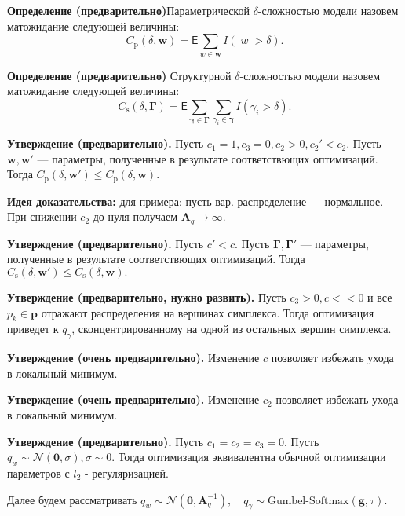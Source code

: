 \documentclass[12pt]{article}
\begin{document}
\textbf{Определение (предварительно)}Параметрической $\delta$-сложностью модели назовем матожидание следующей величины:
\[
    C_\text{p}(\delta, \mathbf{w}) = \mathsf{E}\sum_{w \in \mathbf{w}} I(|w| > \delta).
\] 

\textbf{Определение (предварительно)} Структурной $\delta$-сложностью модели назовем матожидание следующей величины:
\[
     C_\text{s}(\delta, \boldsymbol{\Gamma}) = \mathsf{E}\sum_{\boldsymbol{\gamma} \in \boldsymbol{\Gamma}}\sum_{\gamma_i \in \boldsymbol{\gamma}} I(\gamma_i > \delta). 
\]


\textbf{Утверждение (предварительно).} Пусть $c_1 = 1, c_3 = 0, c_2 > 0, c_2' < c_2$. Пусть $\mathbf{w}, \mathbf{w}'$ --- параметры, полученные в результате соответствющих оптимизаций. Тогда  $C_\text{p}(\delta, \mathbf{w}') \leq C_\text{p}(\delta, \mathbf{w}).$ 

\textbf{Идея доказательства:}  для примера: пусть вар. распределение --- нормальное. При снижении $c_2$ до нуля получаем $\mathbf{A}_q \to \infty$.

\textbf{Утверждение (предварительно).} Пусть $c' < c$. Пусть $ \boldsymbol{\Gamma},  \boldsymbol{\Gamma}'$ --- параметры, полученные в результате соответствющих оптимизаций. Тогда  $C_\text{s}(\delta, \mathbf{w}') \leq C_\text{s}(\delta, \mathbf{w}).$ 

\textbf{Утверждение (предварительно, нужно развить).} Пусть $c_3 > 0, c << 0$ и все $p_k \in \mathbf{p}$ отражают распределения на вершинах симплекса. Тогда оптимизация приведет к $q_\gamma$, сконцентрированному на одной из остальных вершин симплекса.

\textbf{Утверждение (очень предварительно).} Изменение $c$ позволяет избежать ухода в локальный минимум. 

\textbf{Утверждение (очень предварительно).} Изменение $c_2$ позволяет избежать ухода в локальный минимум.

\textbf{Утверждение (предварительно).} Пусть $c_1 = c_2 = c_3 = 0$. Пусть $q_w \sim \mathcal{N}(\mathbf{0}, \sigma), \sigma \sim 0$. 
Тогда оптимизация эквивалентна обычной оптимизации параметров с $l_2$ - регуляризацией.

Далее будем рассматривать $q_w \sim \mathcal{N}(\mathbf{0}, \mathbf{A}_q^{-1}), \quad q_\gamma \sim \text{Gumbel-Softmax}(\mathbf{g}, \tau).$
\end{document}
